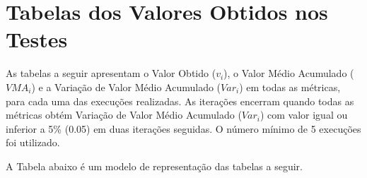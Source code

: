 \apendice

\chapter{Tabelas dos Valores Obtidos nos Testes}
\label{apendice_tabelas_valores}

As tabelas a seguir apresentam o Valor Obtido ($v_i$), o Valor Médio Acumulado ($VMA_i$) e a Variação de Valor Médio Acumulado ($Var_i$) em todas as métricas, para cada uma das execuções realizadas. As iterações encerram quando todas as métricas obtém Variação de Valor Médio Acumulado ($Var_i$) com valor igual ou inferior a 5\% (0.05) em duas iterações seguidas. O número mínimo de 5 execuções foi utilizado.

A Tabela abaixo é um modelo de representação das tabelas a seguir.

